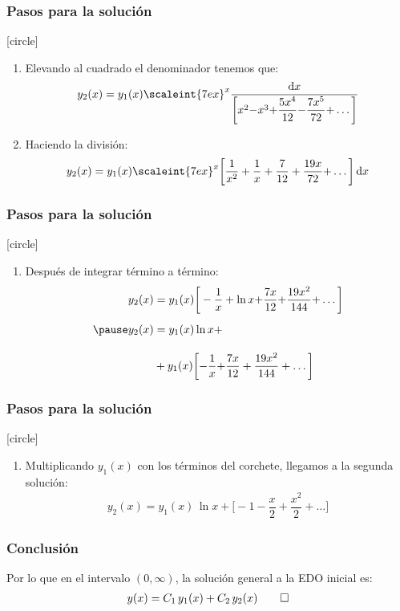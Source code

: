 \documentclass[12pt]{beamer}
\begin{document}
\begin{frame}
\frametitle{Pasos para la solución}
[circle]
\begin{enumerate}[<+->]
\item Elevando al cuadrado el denominador tenemos que:
\begin{align*}
y_{2} (x) = y_{1} (x) \scaleint{7ex}^{x} \dfrac{\dd{x}}{\bigg[ x^{2} {-} x^{3} {+} \dfrac{5 x^{4}}{12} {-} \dfrac{7 x^{5}}{72} {+} \ldots \bigg]} 
\end{align*}
\item Haciendo la división:
\begin{align*}
y_{2} (x) =  y_{1} (x) \scaleint{7ex}^{x} \bigg[ \dfrac{1}{x^{2}} + \dfrac{1}{x} + \dfrac{7}{12} + \dfrac{19 x}{72} {+} \ldots \bigg] \dd{x}
\end{align*}
\seti
\end{enumerate}
\end{frame}
\begin{frame}
\frametitle{Pasos para la solución}
[circle]
\begin{enumerate}[<+->]
\conti    
\item Después de integrar término a término:
\begin{eqnarray*}
\begin{aligned}
y_{2}(x) &= y_{1} (x) \bigg[ - \dfrac{1}{x} + \ln x {+} \dfrac{7 x}{12} {+} \dfrac{19 x^{2}}{144} {+} \ldots \bigg] \\[0.5em] \pause
y_{2}(x) &= y_{1} (x) \ln x + \\[1em]
&+ y_{1}(x) \bigg[ {-} \dfrac{1}{x} {+} \dfrac{7 x}{12} + \dfrac{19 x^{2}}{144} + \ldots \bigg]
\end{aligned}
\end{eqnarray*}
\seti
\end{enumerate}
\end{frame}
\begin{frame}
\frametitle{Pasos para la solución}
[circle]
\begin{enumerate}[<+->]
\conti    
\item Multiplicando $y_{1}(x)$ con los términos del corchete, llegamos a la segunda solución:
\begin{align*}
y_{2} (x) = y_{1} (x) \, \ln x + \bigg[ - 1 {-} \dfrac{x}{2} {+} \dfrac{x^{2}}{2} + \ldots \bigg]
\end{align*}
\end{enumerate}
\end{frame}
\begin{frame}
\frametitle{Conclusión}
Por lo que en el intervalo $(0, \infty)$, la solución general a la EDO inicial es:
\begin{align*}
y(x) = C_{1} \, y_{1} (x) + C_{2} \, y_{2}(x) \qed
\end{align*}
\end{frame}
\end{document}
